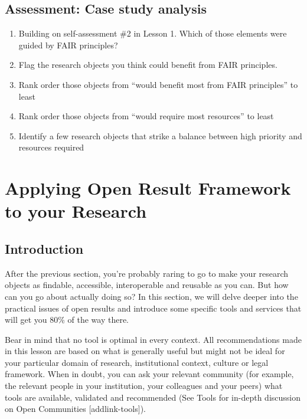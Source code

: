 \documentclass[
  letterpaper,
  DIV=11,
  numbers=noendperiod]{scrreport}
\providecommand{\tightlist}{%
  \setlength{\itemsep}{0pt}\setlength{\parskip}{0pt}}\usepackage{longtable,booktabs,array}
\begin{document}
\hypertarget{assessment-case-study-analysis}{%
\section{Assessment: Case study
analysis}\label{assessment-case-study-analysis}}

\begin{enumerate}
\def\labelenumi{\arabic{enumi}.}
\tightlist
\item
  Building on self-assessment \#2 in Lesson 1. Which of those elements
  were guided by FAIR principles?
\item
  Flag the research objects you think could benefit from FAIR
  principles.
\item
  Rank order those objects from ``would benefit most from FAIR
  principles'' to least
\item
  Rank order those objects from ``would require most resources'' to
  least
\item
  Identify a few research objects that strike a balance between high
  priority and resources required
\end{enumerate}

\hypertarget{applying-open-result-framework-to-your-research}{%
\chapter{Applying Open Result Framework to your
Research}\label{applying-open-result-framework-to-your-research}}

\hypertarget{introduction-17}{%
\section{Introduction}\label{introduction-17}}

After the previous section, you're probably raring to go to make your
research objects as findable, accessible, interoperable and reusable as
you can. But how can you go about actually doing so? In this section, we
will delve deeper into the practical issues of open results and
introduce some specific tools and services that will get you 80\% of the
way there.

Bear in mind that no tool is optimal in every context. All
recommendations made in this lesson are based on what is generally
useful but might not be ideal for your particular domain of research,
institutional context, culture or legal framework. When in doubt, you
can ask your relevant community (for example, the relevant people in
your institution, your colleagues and your peers) what tools are
available, validated and recommended (See Tools for in-depth discussion
on Open Communities {[}addlink-tools{]}).
\end{document}
